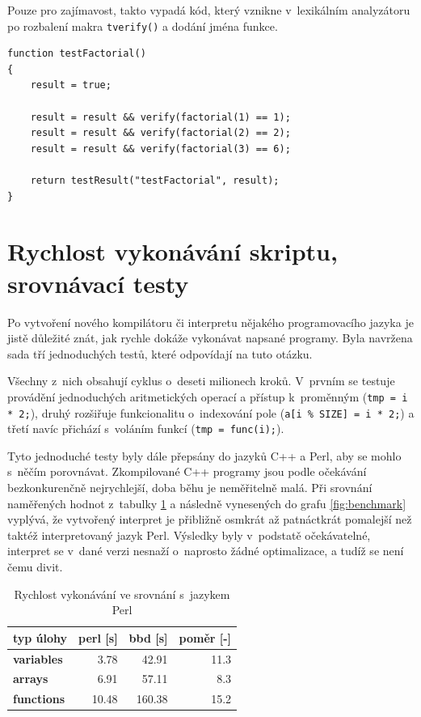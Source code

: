 \documentclass[11pt,twoside,a4paper]{book}
\begin{document}
Pouze pro zajímavost, takto vypadá kód, který vznikne v~lexikálním analyzátoru po rozbalení makra \texttt{tverify()} a dodání jména funkce.

\begin{verbatim}
function testFactorial()
{
    result = true;

    result = result && verify(factorial(1) == 1);
    result = result && verify(factorial(2) == 2);
    result = result && verify(factorial(3) == 6);

    return testResult("testFactorial", result);
}
\end{verbatim}


\section{Rychlost vykonávání skriptu, srovnávací testy}
\label{rychlost_vykonavani_skriptu_srovnavaci_testy}

Po vytvoření nového kompilátoru či interpretu nějakého programovacího jazyka je jistě dů\-le\-ži\-té znát, jak rychle dokáže vykonávat napsané programy. Byla navržena sada tří jednoduchých testů, které odpovídají na tuto otázku.

Všechny z~nich obsahují cyklus o~deseti milionech kroků. V~prvním se testuje provádění jednoduchých aritmetických operací a přístup k~proměnným (\texttt{tmp = i * 2;}), druhý rozšiřuje funkcionalitu o~indexování pole (\texttt{a[i \% SIZE] = i * 2;}) a třetí navíc přichází s~voláním funkcí (\texttt{tmp = func(i);}).

Tyto jednoduché testy byly dále přepsány do jazyků C++ a Perl, aby se mohlo s~něčím porovnávat. Zkompilované C++ programy jsou podle očekávání bezkonkurenčně nejrychlejší, doba běhu je neměřitelně malá. Při srovnání naměřených hodnot z~tabulky \ref{tab:benchmark} a následně vynesených do grafu \ref{fig:benchmark} vyplývá, že vytvořený interpret je přibližně osmkrát až patnáctkrát pomalejší než taktéž interpretovaný jazyk Perl. Výsledky byly v~podstatě očekávatelné, interpret se v~dané verzi nesnaží o~naprosto žádné optimalizace, a tudíž se není čemu divit.

\begin{table}
\begin{center}
\begin{tabular}{|l||r|r||r|}
\hline
\textbf{typ úlohy} & \textbf{perl [s]} & \textbf{bbd [s]} & \textbf{poměr [-]} \\
\hline \hline
\bf{variables} & 3.78 & 42.91 & 11.3 \\
\hline
\bf{arrays} & 6.91 & 57.11 & 8.3 \\
\hline
\bf{functions} & 10.48 & 160.38 & 15.2 \\
\hline
\end{tabular}
\end{center}
\caption{Rychlost vykonávání ve srovnání s~jazykem Perl}
\label{tab:benchmark}
\end{table}
\end{document}
